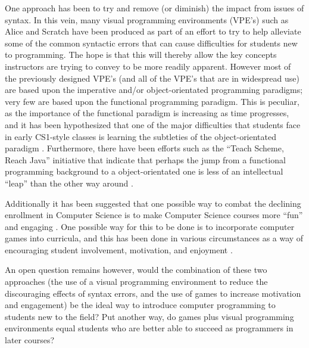 One approach has been to try and remove (or diminish) the impact from issues of syntax.  In this vein, many visual programming environments (VPE's) such as Alice\cite{alice} and Scratch\cite{scratch} have been produced as part of an effort to try to help alleviate some of the common syntactic errors that can cause difficulties for students new to programming.  The hope is that this will thereby allow the key concepts instructors are trying to convey to be more readily apparent.  However most of the previously designed VPE's (and all of the VPE's that are in widespread use) are based upon the imperative and/or object-orientated programming paradigms; very few are based upon the functional programming paradigm.  This is peculiar, as the importance of the functional paradigm is increasing as time progresses, and it has been hypothesized that one of the major difficulties that students face in early CS1-style classes is learning the subtleties of the object-orientated paradigm \cite{Manaris07,Mahmoud04,Benander04}. Furthermore, there have been efforts such as the ``Teach Scheme, Reach Java'' initiative \cite{Bloch08,teachScheme,Felleisen04} that indicate that perhaps the jump from a functional programming background to a object-orientated one is less of an intellectual ``leap'' than the other way around \cite{Huch05}.

Additionally it has been suggested that one possible way to combat the declining enrollment in Computer Science is to make Computer Science courses more ``fun'' and engaging \cite{Carter06}.  One possible way for this to be done is to incorporate computer games into  curricula, and this has been done in various circumstances as a way of encouraging student involvement, motivation, and enjoyment \cite{Barnes08,Gooch08,Curtis05,Overmars05,Sweedyk05}.

An open question remains however, would the combination of these two approaches (the use of a visual programming environment to reduce the discouraging effects of syntax errors, and the use of games to increase motivation and engagement) be the ideal way to introduce computer programming to students new to the field?  Put another way, do games plus visual programming environments equal students who are better able to succeed as programmers in later courses?


